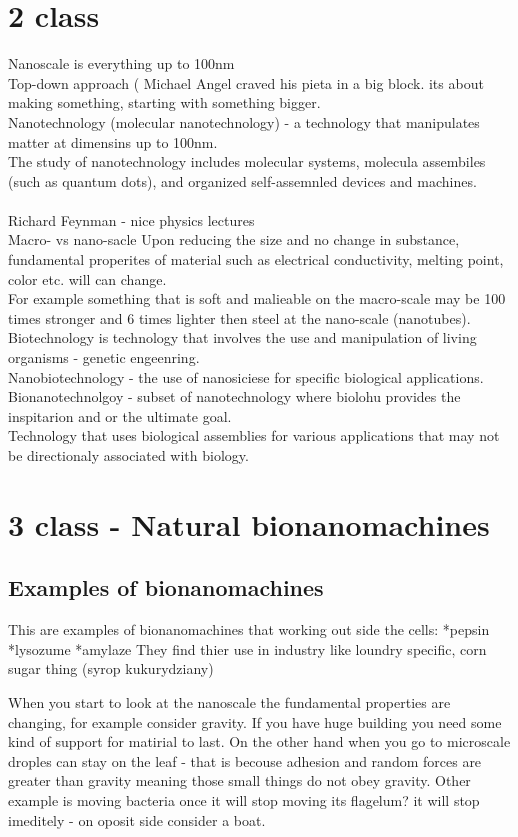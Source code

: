 \documentclass{article}
\begin{document}
\section{2 class}
Nanoscale is everything up to 100nm
\\
Top-down approach ( Michael Angel craved his pieta in a big block.
its about making something, starting with something bigger.
\\
Nanotechnology (molecular nanotechnology) - a technology that manipulates matter at dimensins up to 100nm.\\
The study of nanotechnology includes molecular systems, molecula assembiles (such as quantum dots), and organized self-assemnled devices and machines.\\
\\
Richard Feynman - nice physics lectures
\\
Macro- vs nano-sacle
Upon reducing the size and no change in substance, fundamental properites of 
material such as electrical conductivity, melting point, color etc. will can 
change. \\
For example something that is soft and malieable on the macro-scale may be 100
times stronger and 6 times lighter then steel at the nano-scale (nanotubes).\\
Biotechnology is technology that involves the use and manipulation of living
organisms - genetic engeenring.\\
Nanobiotechnology - the use of nanosiciese for specific biological applications.
Bionanotechnolgoy - subset of nanotechnology where biolohu provides the
inspitarion and or the ultimate goal. \\
Technology that uses biological assemblies
for various applications that may not be directionaly associated with biology.
\\


\section{3 class - Natural bionanomachines}


\subsection{Examples of bionanomachines}
This are examples of bionanomachines that working out side the cells:
*pepsin
*lysozume
*amylaze
They find thier use in industry like loundry specific, corn sugar thing (syrop kukurydziany)

When you start to look at the nanoscale the fundamental properties are changing, for example consider gravity.
If you have huge building you need some kind of support for matirial to last. On the other hand when you go to
microscale droples can stay on the leaf - that is becouse adhesion and random forces are greater than gravity
meaning those small things do not obey gravity. Other example is moving bacteria once it will stop moving its
flagelum? it will stop imeditely - on oposit side consider a boat. 
\end{document}
